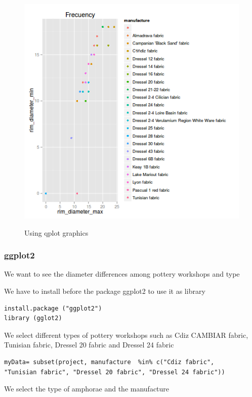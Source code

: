 \documentclass[10pt,a4paper]{article}
\begin{document}
\begin{figure}[hdp]
\centering
\includegraphics[scale=0.30]{qplotminmax.png}
\label{qplot}
\caption{Using qplot graphics}
\end{figure}


\subsubsection{ggplot2}

We want to see the diameter differences among pottery workshops and type

We have to install before the package ggplot2 to use it as library

\begin{verbatim}
install.package ("ggplot2")
library (gglot2)
\end{verbatim}

We select different types of pottery workshops such as Cdiz CAMBIAR fabric, Tunisian fabric, Dressel 20 fabric and Dressel 24 fabric

\begin{verbatim}
myData= subset(project, manufacture  %in% c("Cdiz fabric", 
"Tunisian fabric", "Dressel 20 fabric", "Dressel 24 fabric"))

\end{verbatim}

We select the type of amphorae and the manufacture
\end{document}

